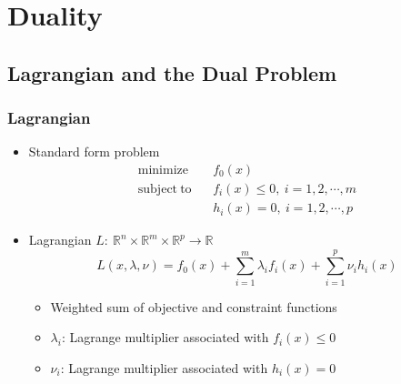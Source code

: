 \section{Duality}

\subsection{Lagrangian and the Dual Problem}

\subsubsection*{Lagrangian}
\begin{itemize}
    \item Standard form problem
    \begin{equation}\begin{aligned}
        \mathrm{minimize}~~&~~f_0(x) \\
        \mathrm{subject~to}~~&~~f_i(x) \leq 0,~i=1,2,\cdots,m \\
            &~~h_i(x) = 0,~i=1,2,\cdots,p
    \end{aligned}\end{equation}
    \item Lagrangian $L:~\mathbb{R}^n\times\mathbb{R}^m\times\mathbb{R}^p\rightarrow\mathbb{R}$
    \begin{equation}
        L(x,\lambda,\nu) = f_0(x) + \sum_{i=1}^m \lambda_i f_i(x) + \sum_{i=1}^p\nu_i h_i(x)
    \end{equation}
    \begin{itemize}
        \item Weighted sum of objective and constraint functions
        \item $\lambda_i$: Lagrange multiplier associated with $f_i(x)\leq 0$
        \item $\nu_i$: Lagrange multiplier associated with $h_i(x)=0$
    \end{itemize}
\end{itemize}

